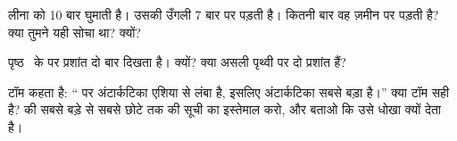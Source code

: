\begin{exercise}[$\star\star$]\label{exo:g3:continents-and-oceans:8}
लीना  को 10 बार घुमाती है। उसकी उँगली 7 बार  पर पड़ती है। कितनी
बार वह ज़मीन पर पड़ती है? क्या तुमने यही सोचा था? क्यों?
\end{exercise}

\begin{exercise}[$\star\star$]\label{exo:g3:continents-and-oceans:9}
पृष्ठ~\pageref{fig:g3:continents-and-oceans:world-map} के  पर
प्रशांत  दो बार दिखता है। क्यों? क्या असली पृथ्वी पर दो प्रशांत
 हैं?
\end{exercise}

\begin{exercise}[$\star\star\star$]\label{exo:g3:continents-and-oceans:10}
टॉम कहता है: `` पर अंटार्कटिका एशिया से लंबा है, इसलिए
अंटार्कटिका सबसे बड़ा  है।'' क्या टॉम सही है?  की सबसे बड़े
से सबसे छोटे तक की सूची का इस्तेमाल करो, और बताओ कि  उसे धोखा
क्यों देता है।
\end{exercise}
